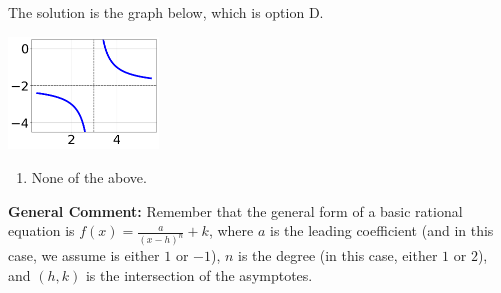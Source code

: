 \documentclass{extbook}[14pt]
\begin{document}
\begin{enumerate}
{The solution is the graph below, which is option D.
\begin{center}
    \includegraphics[width=0.3\textwidth]{../Figures/rationalEquationToGraphDA.png}
\end{center}\begin{enumerate}[label=\Alph*.]
\item None of the above.\end{enumerate}
\textbf{General Comment:} Remember that the general form of a basic rational equation is $ f(x) = \frac{a}{(x-h)^n} + k$, where $a$ is the leading coefficient (and in this case, we assume is either $1$ or $-1$), $n$ is the degree (in this case, either $1$ or $2$), and $(h, k)$ is the intersection of the asymptotes.
}
\end{enumerate}
\end{document}
